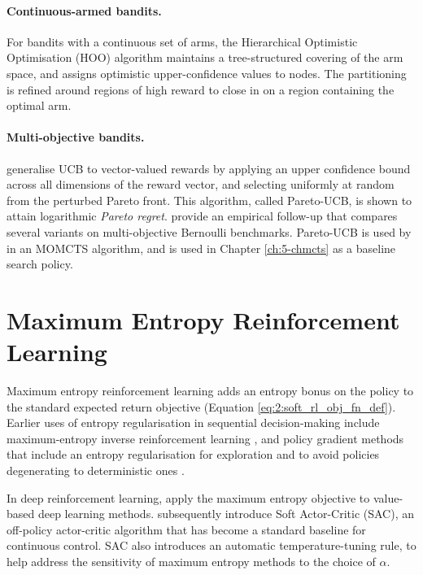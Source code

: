     \paragraph{Continuous-armed bandits.}
    For bandits with a continuous set of arms, the Hierarchical Optimistic Optimisation (HOO) algorithm \cite{hoo,hoo_journal} maintains a tree-structured covering of the arm space, and assigns optimistic upper-confidence values to nodes. The partitioning is refined around regions of high reward to close in on a region containing the optimal arm. %

    \paragraph{Multi-objective bandits.}
    \citet{pareto_ucb} generalise UCB to vector-valued rewards by applying an upper confidence bound across all dimensions of the reward vector, and selecting uniformly at random from the perturbed Pareto front. This algorithm, called Pareto-UCB, is shown to attain logarithmic \textit{Pareto regret}. \citet{pareto_ucb_2} provide an empirical follow-up that compares several variants on multi-objective Bernoulli benchmarks. Pareto-UCB is used by \citet{pareto_momcts} in an MOMCTS algorithm, and is used in Chapter \ref{ch:5-chmcts} as a baseline search policy.




\section{Maximum Entropy Reinforcement Learning}
\label{sec:3-2-rl}

    Maximum entropy reinforcement learning adds an entropy bonus on the policy to the standard expected return objective (Equation \ref{eq:2:soft_rl_obj_fn_def}). Earlier uses of entropy regularisation in sequential decision-making include maximum-entropy inverse reinforcement learning \cite{max_ent_irl,max_ent_irl_thesis}, and policy gradient methods that include an entropy regularisation for exploration and to avoid policies degenerating to deterministic ones \cite{reinforce_ment,a3c,ppo}.

    In deep reinforcement learning, \citet{deep_energy_policies} apply the maximum entropy objective to value-based deep learning methods. %
    \citet{sac} subsequently introduce Soft Actor-Critic (SAC), an off-policy actor-critic algorithm that has become a standard baseline for continuous control. SAC also introduces an automatic temperature-tuning rule, to help address the sensitivity of maximum entropy methods to the choice of $\alpha$. %


